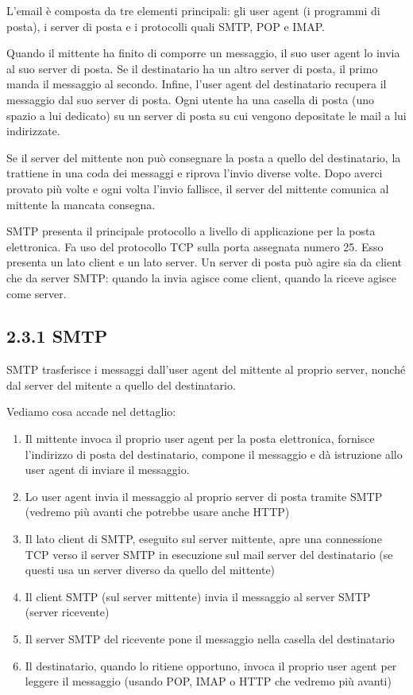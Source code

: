 \documentclass{book}
\begin{document}
L'email è composta da tre elementi principali: gli user agent (i programmi di posta), i server di posta e i protocolli quali SMTP, POP e IMAP.

Quando il mittente ha finito di comporre un messaggio, il suo user agent  lo invia al suo server di posta. Se il destinatario ha un altro server di posta, il primo manda il messaggio al secondo. Infine, l'user agent del destinatario recupera il messaggio dal suo server di posta. Ogni utente ha una casella di posta (uno spazio a lui dedicato) su un server di posta su cui vengono depositate le mail a lui indirizzate.

Se il server del mittente non può consegnare la posta a quello del destinatario, la trattiene in una coda dei messaggi e riprova l'invio diverse volte. Dopo averci provato più volte e ogni volta l'invio fallisce, il server del mittente comunica al mittente la mancata consegna.

SMTP presenta il principale protocollo a livello di applicazione per la posta elettronica. Fa uso del protocollo TCP sulla porta assegnata numero 25. Esso presenta un lato client e un lato server. Un server di posta può agire sia da client che da server SMTP: quando la invia agisce come client, quando la riceve agisce come server.

\subsection*{2.3.1 SMTP}
SMTP trasferisce i messaggi dall'user agent del mittente al proprio server, nonché dal server del mitente a quello del destinatario.

Vediamo cosa accade nel dettaglio:
\begin{enumerate}
	\item Il mittente invoca il proprio user agent per la posta elettronica, fornisce l'indirizzo di posta del destinatario, compone il messaggio e dà istruzione allo user agent di inviare il messaggio.
	
	\item Lo user agent invia il messaggio al proprio server di posta tramite SMTP (vedremo più avanti che potrebbe usare anche HTTP)
	
	\item Il lato client di SMTP, eseguito sul server mittente, apre una connessione TCP verso il server SMTP in esecuzione sul mail server del destinatario (se questi usa un server diverso da quello del mittente)
	
	\item Il client SMTP (sul server mittente) invia il messaggio al server SMTP (server ricevente)
	
	\item Il server SMTP del ricevente pone il messaggio nella casella del destinatario
	
	\item Il destinatario, quando lo ritiene opportuno, invoca il proprio user agent per leggere il messaggio (usando POP, IMAP o HTTP che vedremo più avanti)
\end{enumerate}
\end{document}
